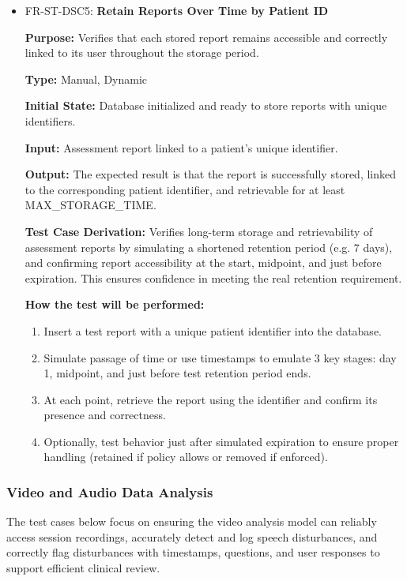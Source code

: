 \documentclass[12pt, titlepage]{article}
\begin{document}
\begin{itemize}
  \item FR-ST-DSC5: \textbf{Retain Reports Over Time by Patient ID}
  \begin{mdframed}[linewidth=0.5mm]
      \textbf{Purpose:} Verifies that each stored report remains accessible and correctly linked to its user throughout the storage period. \par
      \textbf{Type:} Manual, Dynamic \par
      \textbf{Initial State:} Database initialized and ready to store reports with unique identifiers. \par
      \textbf{Input:} Assessment report linked to a patient’s unique identifier. \par
      \textbf{Output:} The expected result is that the report is successfully stored, linked to the corresponding patient identifier, and retrievable for at least MAX\_STORAGE\_TIME. \par
      \textbf{Test Case Derivation:} Verifies long-term storage and retrievability of assessment reports by simulating a shortened retention period (e.g. 7 days), and confirming report accessibility at the start, midpoint, and just before expiration. This ensures confidence in meeting the real retention requirement. \par
      \textbf{How the test will be performed:}
      \begin{enumerate}[noitemsep]
        \item Insert a test report with a unique patient identifier into the database.
        \item Simulate passage of time or use timestamps to emulate 3 key stages: day 1, midpoint, and just before test retention period ends.
        \item At each point, retrieve the report using the identifier and confirm its presence and correctness.
        \item Optionally, test behavior just after simulated expiration to ensure proper handling (retained if policy allows or removed if enforced).
      \end{enumerate}
  \end{mdframed}
\end{itemize}

\subsubsection{Video and Audio Data Analysis}

\hspace{2em}The test cases below focus on ensuring the video analysis model can reliably access 
session recordings, accurately detect and log speech disturbances, and correctly flag 
disturbances with timestamps, questions, and user responses to support efficient clinical review.
\end{document}
